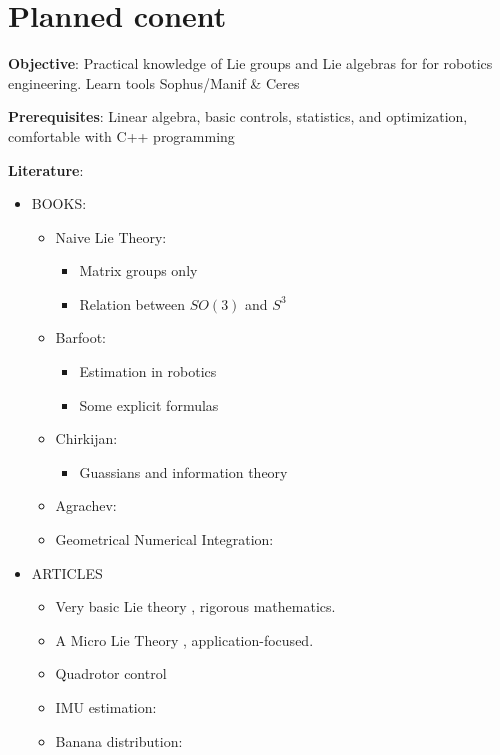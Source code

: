 \section{Planned conent}

\textbf{Objective}: Practical knowledge of Lie groups and Lie algebras for
for robotics engineering. Learn tools Sophus/Manif \& Ceres

\textbf{Prerequisites}: Linear algebra, basic controls, statistics, and optimization, comfortable with C++ programming

\textbf{Literature}:
\begin{itemize}
  \item BOOKS:
        \begin{itemize}
          \item Naive Lie Theory: \cite{stillwell_naive_2008}
                \begin{itemize}
                  \item Matrix groups only
                  \item Relation between $SO(3)$ and $S^3$
                \end{itemize}
          \item Barfoot: \cite{barfoot_state_2017}
                \begin{itemize}
                  \item Estimation in robotics
                  \item Some explicit formulas
                \end{itemize}
          \item Chirkijan: \cite{chirikjian_stochastic_2012, chirikjian_stochastic_2009}
                \begin{itemize}
                  \item Guassians and information theory
                \end{itemize}
          \item Agrachev: \cite{agrachev_control_2004}
          \item Geometrical Numerical Integration: \cite{blanes_concise_2016}
        \end{itemize}

  \item ARTICLES
        \begin{itemize}
          \item Very basic Lie theory \cite{howe_very_1983}, rigorous mathematics.
          \item A Micro Lie Theory \cite{sola_micro_2018}, application-focused.
          \item Quadrotor control \cite{Lee2015}
          \item IMU estimation: \cite{hua_implementation_2014, mahony_nonlinear_2008}
          \item Banana distribution: \cite{wheeler_relative_2018}
        \end{itemize}
\end{itemize}

